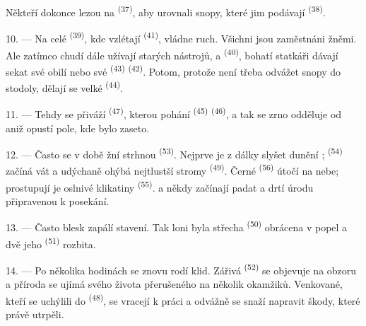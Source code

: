 Někteří dokonce lezou na  \textsuperscript{(37)}, aby urovnali snopy,
které jim podávají  \textsuperscript{(38)}.

10. --- Na celé  \textsuperscript{(39)}, kde vzlétají 
\textsuperscript{(41)}, vládne ruch. Všichni jsou zaměstnáni žněmi. Ale zatímco chudí
dále užívají starých nástrojů,  a 
\textsuperscript{(40)}, bohatí statkáři dávají sekat své obilí nebo své 
\textsuperscript{(43)}  \textsuperscript{(42)}. Potom, protože
není třeba odvážet snopy do stodoly, dělají se velké 
\textsuperscript{(44)}.

11. --- Tehdy se přiváží  \textsuperscript{(47)}, kterou pohání
 \textsuperscript{(45)} 
\textsuperscript{(46)}, a tak se zrno odděluje od  aniž opustí pole,
kde bylo zaseto.

\VUsaut{5.0mm}
\VUsaut{3.4mm}

12. --- Často se v době žní strhnou  \textsuperscript{(53)}. Nejprve je
z dálky slyšet dunění ; 
\textsuperscript{(54)} začíná vát a udýchaně ohýbá nejtlustší stromy 
\textsuperscript{(49)}. Černé  \textsuperscript{(56)} útočí na nebe;
prostupují je oslnivé klikatiny  \textsuperscript{(55)}.  a
někdy  začínají padat a drtí úrodu připravenou k posekání.

13. --- Často blesk zapálí stavení. Tak loni byla střecha 
\textsuperscript{(50)} obrácena v popel a dvě jeho 
\textsuperscript{(51)} rozbita.

14. --- Po několika hodinách se znovu rodí klid. Zářivá 
\textsuperscript{(52)} se objevuje na obzoru a příroda se ujímá svého života
přerušeného na několik okamžiků. Venkované, kteří se uchýlili do 
\textsuperscript{(48)}, se vracejí k práci a odvážně se snaží napravit škody, které
právě utrpěli.

\VUsaut{6.0mm}
\VUsaut{3.6mm}

\VUsaut{1.4mm}
\VUsaut{4.0mm}

